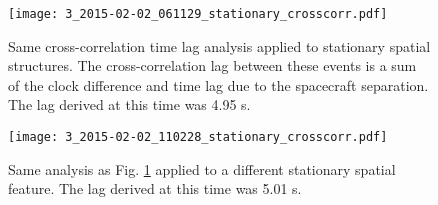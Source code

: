 \begin{figure}
\noindent\texttt{[image: 3\_2015-02-02\_061129\_stationary\_crosscorr.pdf]}
\caption{Same cross-correlation time lag analysis applied to stationary spatial structures. The cross-correlation lag between these events is a sum of the clock difference and time lag due to the spacecraft separation. The lag derived at this time was 4.95 s.}
\label{figure_S5}
\end{figure}

\begin{figure}
\noindent\texttt{[image: 3\_2015-02-02\_110228\_stationary\_crosscorr.pdf]}
\caption{Same analysis as Fig. \ref{figure_S5} applied to a different stationary spatial feature. The lag derived at this time was 5.01 s.}
\label{figure_S6}
\end{figure}